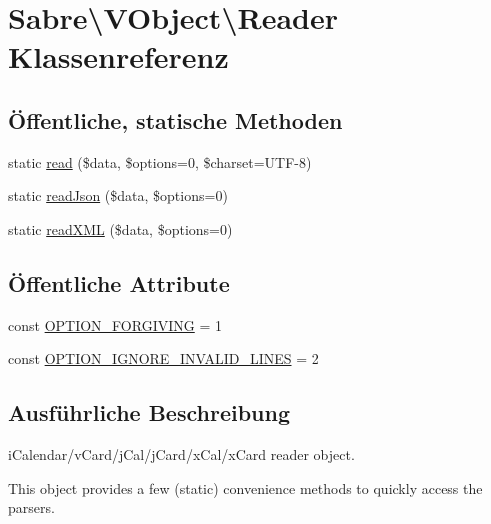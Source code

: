 \hypertarget{class_sabre_1_1_v_object_1_1_reader}{}\section{Sabre\textbackslash{}V\+Object\textbackslash{}Reader Klassenreferenz}
\label{class_sabre_1_1_v_object_1_1_reader}
\subsection*{Öffentliche, statische Methoden}
\begin{DoxyCompactItemize}
\item 
static \mbox{\hyperlink{class_sabre_1_1_v_object_1_1_reader_a0a88110e710521426ffa6e4493de627d}{read}} (\$data, \$options=0, \$charset=\textquotesingle{}U\+TF-\/8\textquotesingle{})
\item 
static \mbox{\hyperlink{class_sabre_1_1_v_object_1_1_reader_a059a23a7322407b049144914267630b3}{read\+Json}} (\$data, \$options=0)
\item 
static \mbox{\hyperlink{class_sabre_1_1_v_object_1_1_reader_ac23b07f0e5dfc628302e0168de765b16}{read\+X\+ML}} (\$data, \$options=0)
\end{DoxyCompactItemize}
\subsection*{Öffentliche Attribute}
\begin{DoxyCompactItemize}
\item 
const \mbox{\hyperlink{class_sabre_1_1_v_object_1_1_reader_a2588463d692eeb803101164828e708a7}{O\+P\+T\+I\+O\+N\+\_\+\+F\+O\+R\+G\+I\+V\+I\+NG}} = 1
\item 
const \mbox{\hyperlink{class_sabre_1_1_v_object_1_1_reader_a385ec22924843a98e5cb0844fd9230f0}{O\+P\+T\+I\+O\+N\+\_\+\+I\+G\+N\+O\+R\+E\+\_\+\+I\+N\+V\+A\+L\+I\+D\+\_\+\+L\+I\+N\+ES}} = 2
\end{DoxyCompactItemize}


\subsection{Ausführliche Beschreibung}
i\+Calendar/v\+Card/j\+Cal/j\+Card/x\+Cal/x\+Card reader object.

This object provides a few (static) convenience methods to quickly access the parsers.

